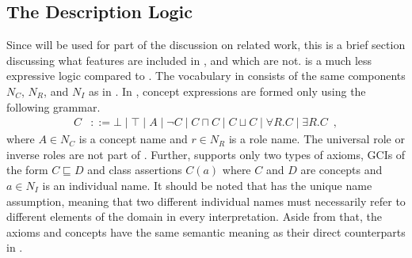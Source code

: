\subsection{The \ALC Description Logic}

Since \ALC will be used for part of the discussion on related work, this is a brief section discussing what features are included in \ALC, and which are not. \ALC is a much less expressive logic compared to \SROIQ. The vocabulary in \ALC consists of the same components $N_C$, $N_R$, and $N_I$ as in \SROIQ. In \ALC, concept expressions are formed only using the following grammar.
\begin{align*}
  C &::= \bot \mid \top \mid A \mid \neg C \mid C \sqcap C \mid C \sqcup C \mid \forall R.C \mid \exists R.C \enspace,
\end{align*}
where $A \in N_C$ is a concept name and $r \in N_R$ is a role name. The universal role or inverse roles are not part of \ALC. Further, \ALC supports only two types of axioms, GCIs of the form $C \sqsubseteq D$ and class assertions $C(a)$ where $C$ and $D$ are concepts and $a \in N_I$ is an individual name. It should be noted that \ALC has the unique name assumption, meaning that two different individual names must necessarily refer to different elements of the domain in every interpretation. Aside from that, the axioms and concepts have the same semantic meaning as their direct counterparts in \SROIQ.

